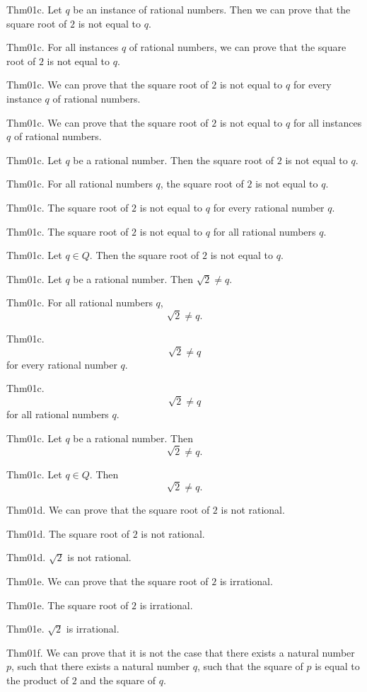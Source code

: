 \documentclass{article}
\begin{document}
Thm01c. Let $q$ be an instance of rational numbers. Then we can prove that the square root of $2$ is not equal to $q$.

Thm01c. For all instances $q$ of rational numbers, we can prove that the square root of $2$ is not equal to $q$.

Thm01c. We can prove that the square root of $2$ is not equal to $q$ for every instance $q$ of rational numbers.

Thm01c. We can prove that the square root of $2$ is not equal to $q$ for all instances $q$ of rational numbers.

Thm01c. Let $q$ be a rational number. Then the square root of $2$ is not equal to $q$.

Thm01c. For all rational numbers $q$, the square root of $2$ is not equal to $q$.

Thm01c. The square root of $2$ is not equal to $q$ for every rational number $q$.

Thm01c. The square root of $2$ is not equal to $q$ for all rational numbers $q$.

Thm01c. Let $q \in Q$. Then the square root of $2$ is not equal to $q$.

Thm01c. Let $q$ be a rational number. Then $\sqrt{ 2}\neq q$.

Thm01c. For all rational numbers $q$, $$\sqrt{ 2}\neq q.$$

Thm01c. $$\sqrt{ 2}\neq q$$ for every rational number $q$.

Thm01c. $$\sqrt{ 2}\neq q$$ for all rational numbers $q$.

Thm01c. Let $q$ be a rational number. Then $$\sqrt{ 2}\neq q.$$

Thm01c. Let $q \in Q$. Then $$\sqrt{ 2}\neq q.$$

Thm01d. We can prove that the square root of $2$ is not rational.

Thm01d. The square root of $2$ is not rational.

Thm01d. $\sqrt{ 2}$ is not rational.

Thm01e. We can prove that the square root of $2$ is irrational.

Thm01e. The square root of $2$ is irrational.

Thm01e. $\sqrt{ 2}$ is irrational.

Thm01f. We can prove that it is not the case that there exists a natural number $p$, such that there exists a natural number $q$, such that the square of $p$ is equal to the product of $2$ and the square of $q$.
\end{document}
